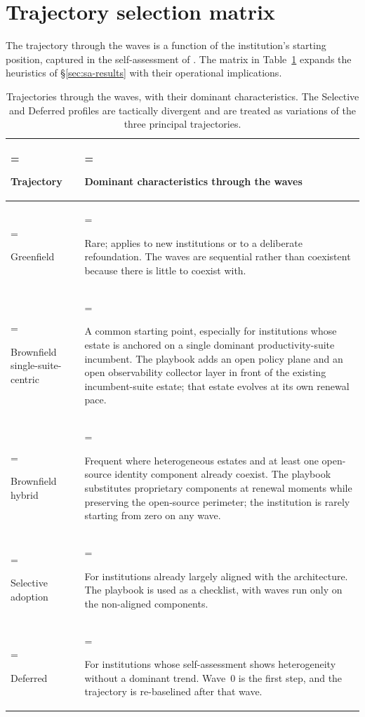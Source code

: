 \section{Trajectory selection matrix}
\label{sec:pr-trajectories}

The trajectory through the waves is a function of the institution's
starting position, captured in the self-assessment of
. The matrix in
Table~\ref{tab:pr-trajectory-detail} expands the heuristics of
\S\ref{sec:sa-results} with their operational implications.

\begin{table}[H]
\centering\small
\caption{Trajectories through the waves, with their dominant
characteristics. The Selective and Deferred profiles are tactically
divergent and are treated as variations of the three principal
trajectories.}
\label{tab:pr-trajectory-detail}
\begin{tabularx}{\textwidth}{%
  >{\hsize=0.4\hsize\linewidth=\hsize\bfseries\raggedright\arraybackslash}X%
  >{\hsize=1.6\hsize\linewidth=\hsize\raggedright\arraybackslash}X%
}
\toprule
Trajectory & Dominant characteristics through the waves \\
\midrule
Greenfield                  & Rare; applies to new institutions or to a deliberate refoundation. The waves are sequential rather than coexistent because there is little to coexist with. \\
Brownfield single-suite-centric & A common starting point, especially for institutions whose estate is anchored on a single dominant productivity-suite incumbent. The playbook adds an open policy plane and an open observability collector layer in front of the existing incumbent-suite estate; that estate evolves at its own renewal pace. \\
Brownfield hybrid           & Frequent where heterogeneous estates and at least one open-source identity component already coexist. The playbook substitutes proprietary components at renewal moments while preserving the open-source perimeter; the institution is rarely starting from zero on any wave. \\
Selective adoption          & For institutions already largely aligned with the architecture. The playbook is used as a checklist, with waves run only on the non-aligned components. \\
Deferred                    & For institutions whose self-assessment shows heterogeneity without a dominant trend. Wave~0 is the first step, and the trajectory is re-baselined after that wave. \\
\bottomrule
\end{tabularx}
\end{table}

